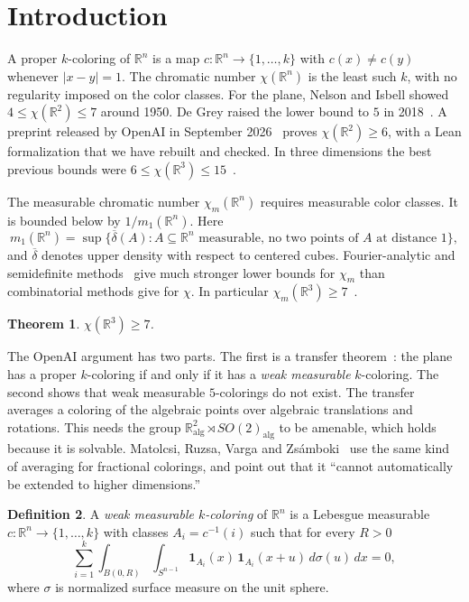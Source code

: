 \documentclass[11pt]{amsart}
\newtheorem{theorem}{Theorem}[section]
\theoremstyle{definition}
\newtheorem{definition}[theorem]{Definition}
\newcommand{\R}{\mathbb{R}}
\begin{document}
\section{Introduction}

A proper $k$-coloring of $\R^n$ is a map $c\colon\R^n\to\{1,\dots,k\}$ with $c(x)\neq c(y)$ whenever $|x-y|=1$. The chromatic number $\chi(\R^n)$ is the least such $k$, with no regularity imposed on the color classes. For the plane, Nelson and Isbell showed $4\le\chi(\R^2)\le7$ around 1950. De Grey raised the lower bound to $5$ in 2018~\cite{deGrey}. A preprint released by OpenAI in September 2026~\cite{OAI} proves $\chi(\R^2)\ge6$, with a Lean formalization that we have rebuilt and checked. In three dimensions the best previous bounds were $6\le\chi(\R^3)\le15$~\cite{Nechushtan,Coulson,RT}.

The measurable chromatic number $\chi_m(\R^n)$ requires measurable color classes. It is bounded below by $1/m_1(\R^n)$. Here
\[
m_1(\R^n)=\sup\{\overline{\delta}(A): A\subseteq\R^n\text{ measurable, no two points of }A\text{ at distance }1\},
\]
and $\overline\delta$ denotes upper density with respect to centered cubes. Fourier-analytic and semidefinite methods~\cite{OV,BPT,DOV} give much stronger lower bounds for $\chi_m$ than combinatorial methods give for $\chi$. In particular $\chi_m(\R^3)\ge7$~\cite{OV,DOV}.

\begin{theorem}\label{thm:main}
$\chi(\R^3)\ge7$.
\end{theorem}

The OpenAI argument has two parts. The first is a transfer theorem~\cite[Theorem 1.3]{OAI}: the plane has a proper $k$-coloring if and only if it has a \emph{weak measurable} $k$-coloring. The second shows that weak measurable $5$-colorings do not exist. The transfer averages a coloring of the algebraic points over algebraic translations and rotations. This needs the group $\R^2_{\mathrm{alg}}\rtimes SO(2)_{\mathrm{alg}}$ to be amenable, which holds because it is solvable. Matolcsi, Ruzsa, Varga and Zs\'amboki~\cite{MRVZ} use the same kind of averaging for fractional colorings, and point out that it ``cannot automatically be extended to higher dimensions.''

\begin{definition}\label{def:weak}
A \emph{weak measurable $k$-coloring} of $\R^n$ is a Lebesgue measurable $c\colon\R^n\to\{1,\dots,k\}$ with classes $A_i=c^{-1}(i)$ such that for every $R>0$
\[
\sum_{i=1}^k\int_{B(0,R)}\int_{S^{n-1}}\mathbf 1_{A_i}(x)\,\mathbf 1_{A_i}(x+u)\,d\sigma(u)\,dx=0 ,
\]
where $\sigma$ is normalized surface measure on the unit sphere.
\end{definition}
\end{document}
